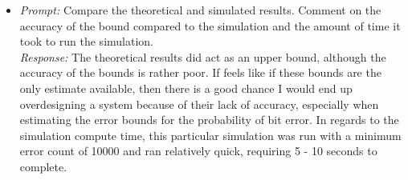 \documentclass{article}
\begin{document}
\begin{itemize}
	\item {\it Prompt: } Compare the theoretical and simulated results. Comment on the accuracy of the bound compared to the simulation and the amount of time it took to run the simulation. \\[0.05in]
				{\it Response: } The theoretical results did act as an upper bound, although the accuracy of the bounds is rather poor.  If feels like if these bounds are the only estimate available, then there is a good chance I would end up overdesigning a system because of their lack of accuracy, especially when estimating the error bounds for the probability of bit error. In regards to the simulation compute time, this particular simulation was run with a minimum error count of 10000 and ran relatively quick, requiring 5 - 10 seconds to complete. 
\end{itemize}
\end{document}

